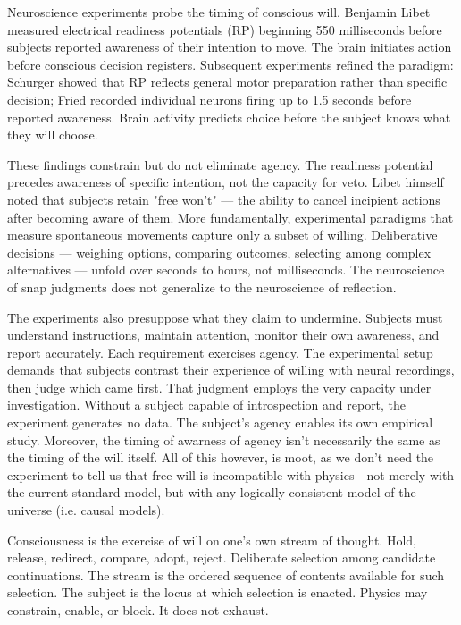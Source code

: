 Neuroscience experiments probe the timing of conscious will. Benjamin Libet measured electrical readiness potentials (RP) beginning 550 milliseconds before subjects reported awareness of their intention to move. The brain initiates action before conscious decision registers. Subsequent experiments refined the paradigm: Schurger showed that RP reflects general motor preparation rather than specific decision; Fried recorded individual neurons firing up to 1.5 seconds before reported awareness. Brain activity predicts choice before the subject knows what they will choose.

These findings constrain but do not eliminate agency. The readiness potential precedes awareness of specific intention, not the capacity for veto. Libet himself noted that subjects retain "free won't" — the ability to cancel incipient actions after becoming aware of them. More fundamentally, experimental paradigms that measure spontaneous movements capture only a subset of willing. Deliberative decisions — weighing options, comparing outcomes, selecting among complex alternatives — unfold over seconds to hours, not milliseconds. The neuroscience of snap judgments does not generalize to the neuroscience of reflection.

The experiments also presuppose what they claim to undermine. Subjects must understand instructions, maintain attention, monitor their own awareness, and report accurately. Each requirement exercises agency. The experimental setup demands that subjects contrast their experience of willing with neural recordings, then judge which came first. That judgment employs the very capacity under investigation. Without a subject capable of introspection and report, the experiment generates no data. The subject's agency enables its own empirical study. Moreover, the timing of awarness of agency isn't necessarily the same as the timing of the will itself. All of this however, is moot, as we don't need the experiment to tell us that free will is incompatible with physics - not merely with the current standard model, but with any logically consistent model of the universe (i.e. causal models).

Consciousness is the exercise of will on one's own stream of thought. Hold, release, redirect, compare, adopt, reject. Deliberate selection among candidate continuations. The stream is the ordered sequence of contents available for such selection. The subject is the locus at which selection is enacted. Physics may constrain, enable, or block. It does not exhaust.

